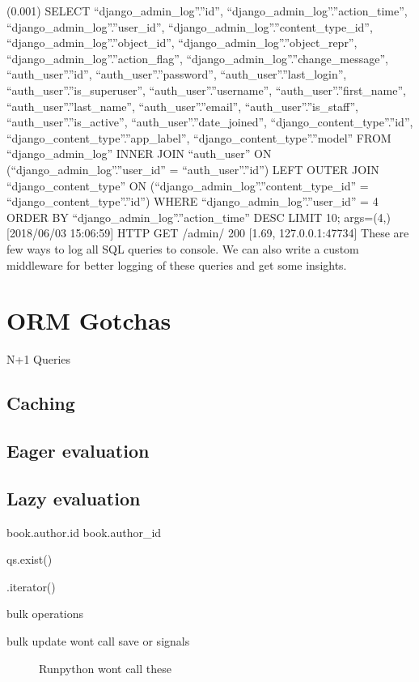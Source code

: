 \documentclass[letterpaper,11pt,english]{sphinxmanual}
\begin{document}
(0.001) SELECT “django\_admin\_log”.”id”, “django\_admin\_log”.”action\_time”, “django\_admin\_log”.”user\_id”, “django\_admin\_log”.”content\_type\_id”, “django\_admin\_log”.”object\_id”, “django\_admin\_log”.”object\_repr”, “django\_admin\_log”.”action\_flag”, “django\_admin\_log”.”change\_message”, “auth\_user”.”id”, “auth\_user”.”password”, “auth\_user”.”last\_login”, “auth\_user”.”is\_superuser”, “auth\_user”.”username”, “auth\_user”.”first\_name”, “auth\_user”.”last\_name”, “auth\_user”.”email”, “auth\_user”.”is\_staff”, “auth\_user”.”is\_active”, “auth\_user”.”date\_joined”, “django\_content\_type”.”id”, “django\_content\_type”.”app\_label”, “django\_content\_type”.”model” FROM “django\_admin\_log” INNER JOIN “auth\_user” ON (“django\_admin\_log”.”user\_id” = “auth\_user”.”id”) LEFT OUTER JOIN “django\_content\_type” ON (“django\_admin\_log”.”content\_type\_id” = “django\_content\_type”.”id”) WHERE “django\_admin\_log”.”user\_id” = 4 ORDER BY “django\_admin\_log”.”action\_time” DESC LIMIT 10; args=(4,)
{[}2018/06/03 15:06:59{]} HTTP GET /admin/ 200 {[}1.69, 127.0.0.1:47734{]}
These are few ways to log all SQL queries to console. We can also write a custom middleware for better logging of these queries and get some insights.


\chapter{ORM Gotchas}
\label{\detokenize{orm_optimizations:orm-gotchas}}\label{\detokenize{orm_optimizations::doc}}
N+1 Queries


\section{Caching}
\label{\detokenize{orm_optimizations:caching}}

\section{Eager evaluation}
\label{\detokenize{orm_optimizations:eager-evaluation}}

\section{Lazy evaluation}
\label{\detokenize{orm_optimizations:lazy-evaluation}}
book.author.id
book.author\_id

qs.exist()

.iterator()

bulk operations
\begin{description}
\item[{bulk update wont call save or signals}] \leavevmode
Runpython wont call these

\end{description}
\end{document}
